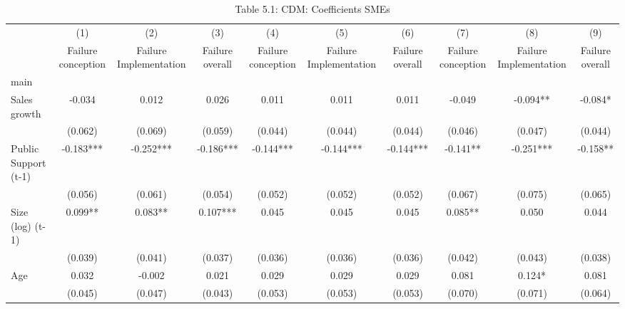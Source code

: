 \begin{table}[htbp]\centering
\def\sym#1{\ifmmode^{#1}\else\(^{#1}\)\fi}
\caption{{Table 5.1: CDM: Coefficients SMEs}}
\begin{tabular}{l*{9}{c}}
\hline\hline
                    &\multicolumn{1}{c}{(1)}&\multicolumn{1}{c}{(2)}&\multicolumn{1}{c}{(3)}&\multicolumn{1}{c}{(4)}&\multicolumn{1}{c}{(5)}&\multicolumn{1}{c}{(6)}&\multicolumn{1}{c}{(7)}&\multicolumn{1}{c}{(8)}&\multicolumn{1}{c}{(9)}\\
                    &\multicolumn{1}{c}{Failure conception}&\multicolumn{1}{c}{Failure Implementation}&\multicolumn{1}{c}{Failure overall}&\multicolumn{1}{c}{Failure conception}&\multicolumn{1}{c}{Failure Implementation}&\multicolumn{1}{c}{Failure overall}&\multicolumn{1}{c}{Failure conception}&\multicolumn{1}{c}{Failure Implementation}&\multicolumn{1}{c}{Failure overall}\\
\hline
main                &               &               &               &               &               &               &               &               &               \\
Sales growth        &      -0.034   &       0.012   &       0.026   &       0.011   &       0.011   &       0.011   &      -0.049   &      -0.094** &      -0.084*  \\
                    &     (0.062)   &     (0.069)   &     (0.059)   &     (0.044)   &     (0.044)   &     (0.044)   &     (0.046)   &     (0.047)   &     (0.044)   \\
Public Support (t-1)&      -0.183***&      -0.252***&      -0.186***&      -0.144***&      -0.144***&      -0.144***&      -0.141** &      -0.251***&      -0.158** \\
                    &     (0.056)   &     (0.061)   &     (0.054)   &     (0.052)   &     (0.052)   &     (0.052)   &     (0.067)   &     (0.075)   &     (0.065)   \\
Size (log) (t-1)    &       0.099** &       0.083** &       0.107***&       0.045   &       0.045   &       0.045   &       0.085** &       0.050   &       0.044   \\
                    &     (0.039)   &     (0.041)   &     (0.037)   &     (0.036)   &     (0.036)   &     (0.036)   &     (0.042)   &     (0.043)   &     (0.038)   \\
Age                 &       0.032   &      -0.002   &       0.021   &       0.029   &       0.029   &       0.029   &       0.081   &       0.124*  &       0.081   \\
                    &     (0.045)   &     (0.047)   &     (0.043)   &     (0.053)   &     (0.053)   &     (0.053)   &     (0.070)   &     (0.071)   &     (0.064)   \\

\end{tabular}
\end{table}
